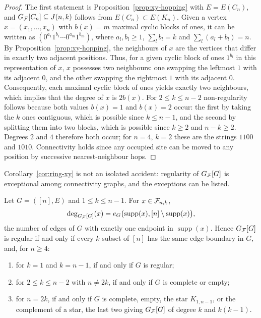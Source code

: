 {\begin{proof}
The first statement is Proposition~\ref{prop:xy-hopping} with $E=E(C_n)$, and $G_{\mathcal{F}}[C_n]\subseteq J(n,k)$ follows from $E(C_n)\subset E(K_n)$. Given a vertex $x=(x_1,\dots,x_n)$ with $b(x)=m$ maximal cyclic blocks of ones, it can be written as $(0^{a_1}1^{b_1}\cdots 0^{a_m}1^{b_m})$, where $a_l,b_l\ge1$, $\sum_l b_l=k$ and $\sum_l(a_l+b_l)=n$. By Proposition~\ref{prop:xy-hopping}, the neighbours of $x$ are the vertices that differ in exactly two adjacent positions. Thus, for a given cyclic block of ones $1^{b_l}$ in this representation of $x$, $x$ possesses two neighbours: one swapping the leftmost $1$ with its adjacent $0$, and the other swapping the rightmost $1$ with its adjacent $0$. Consequently, each maximal cyclic block of ones yields exactly two neighbours, which implies that the degree of $x$ is $2b(x)$. For $2\le k\le n-2$ non-regularity follows because both values $b(x)=1$ and $b(x)=2$ occur: the first by taking the $k$ ones contiguous, which is possible since $k\le n-1$, and the second by splitting them into two blocks, which is possible since $k\ge2$ and $n-k\ge2$. Degrees $2$ and $4$ therefore both occur; for $n=4$, $k=2$ these are the strings $1100$ and $1010$. Connectivity holds since any occupied site can be moved to any position by successive nearest-neighbour hops.
\end{proof}

Corollary~\ref{cor:ring-xy} is not an isolated accident: regularity of $G_{\mathcal{F}}[G]$ is exceptional among connectivity graphs, and the exceptions can be listed.

\begin{proposition}
\label{prop:xy-regularity}
Let $G=([n],E)$ and $1\le k\le n-1$. For $x\in\mathcal{F}_{n,k}$,
\begin{equation}
\deg_{G_{\mathcal{F}}[G]}(x) = e_G\bigl(\operatorname{supp}(x),[n]\setminus\operatorname{supp}(x)\bigr),
    \label{eq:boundary-degree}
\end{equation}
the number of edges of $G$ with exactly one endpoint in $\operatorname{supp}(x)$. Hence $G_{\mathcal{F}}[G]$ is regular if and only if every $k$-subset of $[n]$ has the same edge boundary in $G$, and, for $n\ge4$:
\begin{enumerate}
\item[(i)] for $k=1$ and $k=n-1$, if and only if $G$ is regular;
\item[(ii)] for $2\le k\le n-2$ with $n\neq2k$, if and only if $G$ is
complete or empty;
\item[(iii)] for $n=2k$, if and only if $G$ is complete, empty, the star
$K_{1,n-1}$, or the complement of a star, the last two giving $G_{\mathcal{F}}[G]$ of degree $k$ and $k(k-1)$.
\end{enumerate}
\end{proposition}

}
